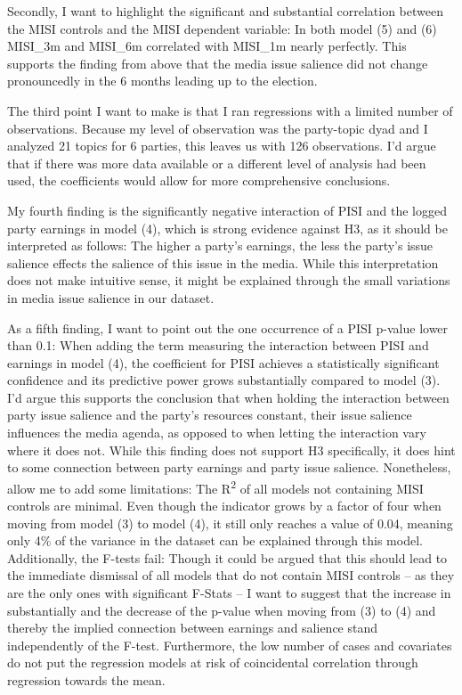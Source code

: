 \documentclass[11pt,a4paper]{article}
\begin{document}
Secondly, I want to highlight the significant and substantial correlation between the MISI controls and the MISI dependent variable: In both model (5) and (6) MISI\_3m and MISI\_6m correlated with MISI\_1m nearly perfectly. This supports the finding from above that the media issue salience did not change pronouncedly in the 6 months leading up to the election.

The third point I want to make is that I ran regressions with a limited number of observations. Because my level of observation was the party-topic dyad and I analyzed 21 topics for 6 parties, this leaves us with 126 observations. I’d argue that if there was more data available or a different level of analysis had been used, the coefficients would allow for more comprehensive conclusions.

My fourth finding is the significantly negative interaction of PISI and the logged party earnings in model (4), which is strong evidence against H3, as it should be interpreted as follows: The higher a party's earnings, the less the party's issue salience effects the salience of this issue in the media. While this interpretation does not make intuitive sense, it might be explained through the small variations in media issue salience in our dataset.

As a fifth finding, I want to point out the one occurrence of a PISI p-value lower than 0.1: When adding the term measuring the interaction between PISI and earnings in model (4), the coefficient for PISI achieves a statistically significant confidence and its predictive power grows substantially compared to model (3). I’d argue this supports the conclusion that when holding the interaction between party issue salience and the party’s resources constant, their issue salience influences the media agenda, as opposed to when letting the interaction vary where it does not. While this finding does not support H3 specifically, it does hint to some connection between party earnings and party issue salience. Nonetheless, allow me to add some limitations: The R\textsuperscript{2} of all models not containing MISI controls are minimal. Even though the indicator grows by a factor of four when moving from model (3) to model (4), it still only reaches a value of 0.04, meaning only 4\% of the variance in the dataset can be explained through this model. Additionally, the F-tests fail: Though it could be argued that this should lead to the immediate dismissal of all models that do not contain MISI controls – as they are the only ones with significant F-Stats – I want to suggest that the increase in substantially and the decrease of the p-value when moving from (3) to (4) and thereby the implied connection between earnings and salience stand independently of the F-test. Furthermore, the low number of cases and covariates do not put the regression models at risk of coincidental correlation through regression towards the mean.
\end{document}
